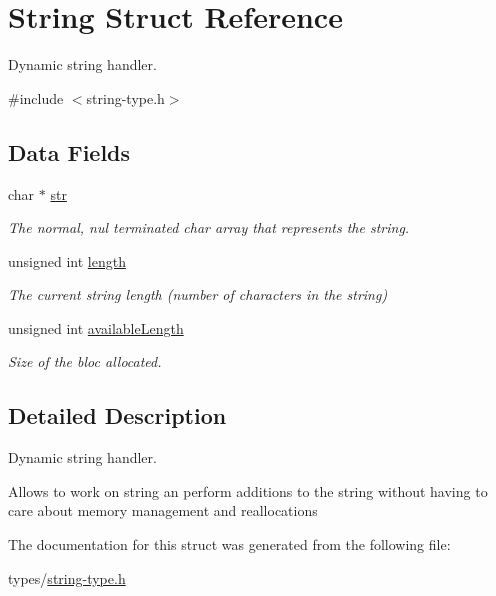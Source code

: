 \hypertarget{struct_string}{}\section{String Struct Reference}
\label{struct_string}


Dynamic string handler.  




{\ttfamily \#include $<$string-\/type.\+h$>$}

\subsection*{Data Fields}
\begin{DoxyCompactItemize}
\item 
char $\ast$ \hyperlink{struct_string_ab50d783982593ef993ea0b68f7ad8b80}{str}\hypertarget{struct_string_ab50d783982593ef993ea0b68f7ad8b80}{}\label{struct_string_ab50d783982593ef993ea0b68f7ad8b80}

\begin{DoxyCompactList}\small\item\em The normal, nul terminated char array that represents the string. \end{DoxyCompactList}\item 
unsigned int \hyperlink{struct_string_ac8d42bcd4a44e078047ccd7291059238}{length}\hypertarget{struct_string_ac8d42bcd4a44e078047ccd7291059238}{}\label{struct_string_ac8d42bcd4a44e078047ccd7291059238}

\begin{DoxyCompactList}\small\item\em The current string length (number of characters in the string) \end{DoxyCompactList}\item 
unsigned int \hyperlink{struct_string_a6083a430d1675d875ecb3a8319b5c3b8}{available\+Length}\hypertarget{struct_string_a6083a430d1675d875ecb3a8319b5c3b8}{}\label{struct_string_a6083a430d1675d875ecb3a8319b5c3b8}

\begin{DoxyCompactList}\small\item\em Size of the bloc allocated. \end{DoxyCompactList}\end{DoxyCompactItemize}


\subsection{Detailed Description}
Dynamic string handler. 

Allows to work on string an perform additions to the string without having to care about memory management and reallocations 

The documentation for this struct was generated from the following file\+:\begin{DoxyCompactItemize}
\item 
types/\hyperlink{string-type_8h}{string-\/type.\+h}\end{DoxyCompactItemize}
